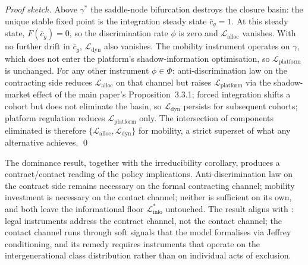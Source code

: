 \documentclass[12pt,a4paper]{article}
\theoremstyle{definition}
\numberwithin{proposition}{section}
\begin{document}
\begin{proof}[Proof sketch]
Above $\gamma^*$ the saddle-node bifurcation destroys the closure
basin: the unique stable fixed point is the integration steady
state $\bar{c}_g = 1$. At this steady state, $F(\bar{c}_g) = 0$,
so the discrimination rate $\phi$ is zero and
$\mathcal{L}_{\text{alloc}}$ vanishes. With no further drift in
$\bar{c}_g$, $\mathcal{L}_{\text{dyn}}$ also vanishes. The
mobility instrument operates on $\gamma$, which does not enter the
platform's shadow-information optimisation, so
$\mathcal{L}_{\text{platform}}$ is unchanged. For any other
instrument $\phi \in \Phi$:
anti-discrimination law on the contracting side reduces
$\mathcal{L}_{\text{alloc}}$ on that channel but raises
$\mathcal{L}_{\text{platform}}$ via the shadow-market effect of
the main paper's Proposition~3.3.1; forced integration shifts a
cohort but does not eliminate the basin, so
$\mathcal{L}_{\text{dyn}}$ persists for subsequent cohorts;
platform regulation reduces $\mathcal{L}_{\text{platform}}$ only.
The intersection of components eliminated is therefore
$\{\mathcal{L}_{\text{alloc}}, \mathcal{L}_{\text{dyn}}\}$ for
mobility, a strict superset of what any alternative achieves.
\qed
\end{proof}

The dominance result, together with the irreducibility corollary,
produces a contract/contact reading of the policy implications.
Anti-discrimination law on the contract side
remains necessary on the formal contracting channel; mobility
investment is necessary on the contact channel; neither is
sufficient on its own, and both leave the informational floor
$\mathcal{L}_{\text{info}}^*$ untouched. The result aligns with
\citet{Loury2002}: legal instruments address the contract channel,
not the contact channel; the contact channel runs through soft
signals that the model formalises via Jeffrey conditioning, and
its remedy requires instruments that operate on the
intergenerational class distribution rather than on individual
acts of exclusion.



\end{document}
